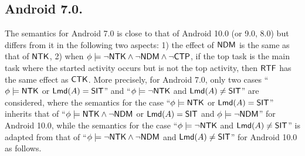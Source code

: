 \subsection{Android 7.0.}
The semantics for Android 7.0 is close to that of Android 10.0 (or 9.0, 8.0) but differs from it in the following two aspects:  1) the effect of ${\sf NDM}$ is the same as that of ${\sf NTK}$, 2)
when $\phi \models \neg {\sf NTK} \wedge \neg{\sf NDM} \wedge \neg{\sf CTP}$, if the top task is the main task where the started activity occurs but is not the top activity, then ${\sf RTF}$ has the same effect as ${\sf CTK}$. More precisely, for Android 7.0, only two cases ``$\phi \models {\sf NTK}$ or ${\sf Lmd}(A) = {\sf SIT}$'' and ``$\phi  \models \neg {\sf NTK}$ and ${\sf Lmd}(A)\neq{\sf SIT}$'' are considered, where the semantics for the case ``$\phi \models {\sf NTK}$ or ${\sf Lmd}(A) = {\sf SIT}$'' inherits that of ``$\phi \models {\sf NTK} \wedge \neg {\sf NDM}$ or ${\sf Lmd}(A) = {\sf SIT}$ and $\phi\models\neg{\sf NDM}$'' for Android 10.0, while the semantics for the case ``$\phi  \models \neg {\sf NTK}$ and ${\sf Lmd}(A) \neq {\sf SIT}$'' is adapted from that of ``$\phi \models \neg {\sf NTK} \wedge \neg {\sf NDM}$ and ${\sf Lmd}(A) \neq {\sf SIT}$'' for Android 10.0 as follows. 
%
%
%
